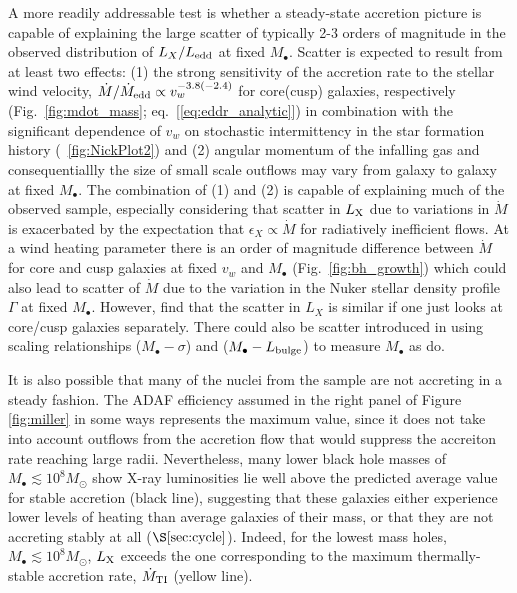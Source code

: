 \documentclass[usenatbib,fleqn]{mn2e}
\newcommand{\Mbh}[1][]{M_{\bullet#1}}
\begin{document}
A more readily addressable test is whether a steady-state accretion
picture is capable of explaining the large scatter of typically 2-3
orders of magnitude in the observed distribution of $L_{X}/L_{\rm
  edd}$ at fixed $M_{\bullet}$.  Scatter is expected to result from at
least two effects: (1) the strong sensitivity of the accretion rate to
the stellar wind velocity, $\dot{M}/\dot{M}_{\rm edd} \propto
v_{w}^{-3.8(-2.4)}$ for core(cusp) galaxies, respectively
(Fig.~\ref{fig:mdot_mass}; eq.~[\ref{eq:eddr_analytic}]) in
combination with the significant dependence of $v_w$ on stochastic
intermittency in the star formation history (~\ref{fig:NickPlot2}) and
(2) angular momentum of the infalling gas and consequentiallly the
size of small scale outflows may vary from galaxy to galaxy at fixed
$\Mbh$. The combination of (1) and (2) is capable of explaining much
of the observed sample, especially considering that scatter in $L_{\rm
  X}$ due to variations in $\dot{M}$ is exacerbated by the expectation
that $\epsilon_{X} \propto \dot{M}$ for radiatively inefficient
flows. At a wind heating parameter there is an order of magnitude
difference between $\dot{M}$ for core and cusp galaxies at fixed $v_w$
and $M_{\bullet}$ (Fig.~\ref{fig:bh_growth}) which could also lead to
scatter of $\dot{M}$ due to the variation in the Nuker stellar density
profile $\Gamma$ at fixed $M_{\bullet}$. However, \citet{Pellegrini10}
find that the scatter in $L_X$ is similar if one just looks at
core/cusp galaxies separately. There could also be scatter introduced
in using scaling relationships ($\Mbh-\sigma$) and ($\Mbh-L_{\rm
  bulge}$) to measure $\Mbh$ as \citet{Miller+15} do.


It is also possible that many of the nuclei from the \citet{Miller+15}
sample are not accreting in a steady fashion.  The ADAF efficiency
assumed in the right panel of Figure \ref{fig:miller} in some ways
represents the maximum value, since it does not take into account
outflows from the accretion flow that would suppress the accreiton
rate reaching large radii.  Nevertheless, many lower black hole masses
of $M_{\bullet} \lesssim 10^{8}M_{\odot}$ show X-ray luminosities lie
well above the predicted average value for stable accretion (black
line), suggesting that these galaxies either experience lower levels
of heating than average galaxies of their mass, or that they are not
accreting stably at all ($\S\ref{sec:cycle}$).  Indeed, for the lowest
mass holes, $M_{\bullet} \lesssim 10^{8}M_{\odot}$, $L_{\rm X}$
exceeds the one corresponding to the maximum thermally-stable
accretion rate, $\dot{M}_{\rm TI}$ (yellow line).  
\end{document}
